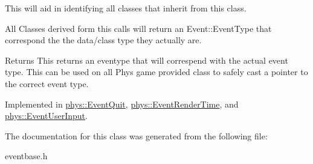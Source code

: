 This will aid in identifying all classes that inherit from this class. 

All Classes derived form this calls will return an Event::EventType that correspond the the data/class type they actually are. \begin{DoxyReturn}{Returns}
This returns an eventype that will correspend with the actual event type. This can be used on all Phys game provided class to safely cast a pointer to the correct event type. 
\end{DoxyReturn}


Implemented in \hyperlink{classphys_1_1EventQuit_a3bfca875349e73dbda47c3c62a253e3b}{phys::EventQuit}, \hyperlink{classphys_1_1EventRenderTime_a160ca55bf9e5a2ae80dab82eab88baf5}{phys::EventRenderTime}, and \hyperlink{classphys_1_1EventUserInput_a3e803a8d9bcc1576fe04d2245a86ec80}{phys::EventUserInput}.



The documentation for this class was generated from the following file:\begin{DoxyCompactItemize}
\item 
eventbase.h\end{DoxyCompactItemize}
